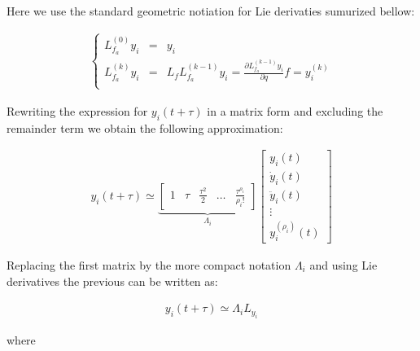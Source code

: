\documentclass[letterpaper, 10 pt, conference]{ieeeconf}  %
\begin{document}
Here we use the standard geometric notiation for Lie derivaties sumurized bellow:

\begin{eqnarray*}
\left\lbrace\begin{array}{lcl}
L_{f_a}^{(0)}y_i & = & y_i\\
L_{f_a}^{(k)} y_i & = & L_fL_{f_a}^{(k-1)}y_i = \frac{\partial L_{f_a}^{(k-1)}y_i}{\partial q}f = y^{(k)}_i\\
\end{array}\right.
\end{eqnarray*}

Rewriting the expression for $y_i(t+\tau)$ in a matrix form and excluding the remainder term we obtain the following approximation:

\begin{eqnarray}
y_i(t+\tau) \simeq \underbrace{\left[\begin{array}{ccccc}
1 & \tau & \frac{\tau^2}{2} & \dots & \frac{\tau^{\rho_i}}{{\rho_i}!}
\end{array}\right]}_{\Lambda_i}
\left[\begin{array}{c}
y_i(t)\\
\dot{y}_i(t)\\
\ddot{y}_i(t)\\
\vdots\\
y^{(\rho_i)}_i(t)
\end{array}\right]
\end{eqnarray}


Replacing the first matrix by the more compact notation $\Lambda_i$ and using Lie derivatives the previous can be written as:

\begin{eqnarray}
y_i(t+\tau) \simeq \Lambda_i L_{y_i}
\end{eqnarray}

where

\end{document}
